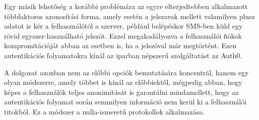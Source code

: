 Egy másik lehetőség a korábbi problémára az egyre elterjedtebben alkalmazott többfaktoros azonosítási forma, amely esetén a jelszavak mellett valamilyen plusz adatot is kér a felhasználótól a szerver, például belépéskor SMS-ben küld egy rövid egyszer-használható jelszót. Ezzel megakadályozva a felhasználói fiókok kompromitációját abban az esetben is, ha a jelszóval már megtörtént. Ezen autentikációs folyamatokra kínál az iparban népszerű szolgáltatást az Auth0.

A dolgozat azonban nem az előbbi opciók bemutatására koncentrál, hanem egy olyan módszerre, amely többet is kínál az előbbiektől, mégpedig abban, hogy képes a felhasználók teljes anonimitását is garantálni mindamellett, hogy az autentikációs folyamat során semmilyen információ nem kerül ki a felhasználói titokból. Ez a módszer a nulla-ismeretű protokollok alkalmazása.